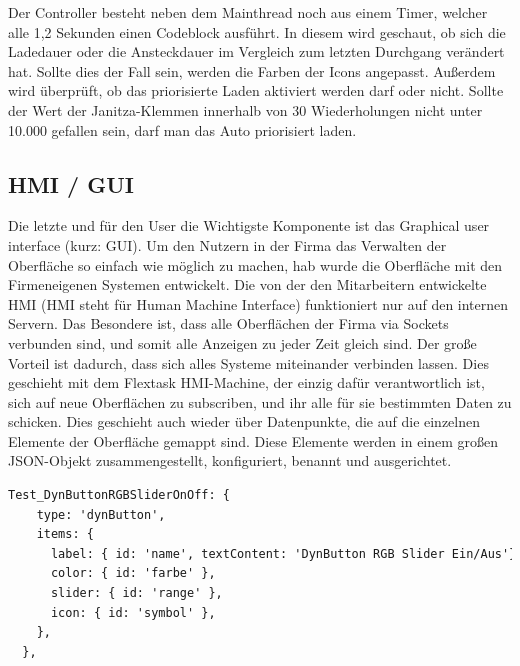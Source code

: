 Der Controller besteht neben dem Mainthread noch aus einem Timer, welcher alle 1,2 Sekunden einen Codeblock ausführt. In diesem wird geschaut, ob sich die Ladedauer oder die Ansteckdauer im Vergleich zum letzten Durchgang verändert hat. Sollte dies der Fall sein, werden die Farben der Icons angepasst. Außerdem wird überprüft, ob das priorisierte Laden aktiviert werden darf oder nicht. Sollte der Wert der Janitza-Klemmen innerhalb von 30 Wiederholungen nicht unter 10.000 gefallen sein, darf man das Auto priorisiert laden.

\subsection{HMI / GUI} 
Die letzte und für den User die Wichtigste Komponente ist das Graphical user interface (kurz: GUI). Um den Nutzern in der Firma das Verwalten der Oberfläche so einfach wie möglich zu machen, hab wurde die Oberfläche mit den Firmeneigenen Systemen entwickelt. Die von der den Mitarbeitern entwickelte HMI (HMI steht für Human Machine Interface) funktioniert nur auf den internen Servern. Das Besondere ist, dass alle Oberflächen der Firma via Sockets verbunden sind, und somit alle Anzeigen zu jeder Zeit gleich sind. Der große Vorteil ist dadurch, dass sich alles Systeme miteinander verbinden lassen. Dies geschieht mit dem Flextask 	\glqq HMI-Machine\grqq{}, der einzig dafür verantwortlich ist, sich auf neue Oberflächen zu subscriben, und ihr alle für sie bestimmten Daten zu schicken. Dies geschieht auch wieder über Datenpunkte, die auf die einzelnen Elemente der Oberfläche gemappt sind. Diese Elemente werden in einem großen JSON-Objekt zusammengestellt, konfiguriert, benannt und ausgerichtet. 

\begin{lstlisting}[language=HTML,caption=Example Element,label=lst:impl:foo]
  Test_DynButtonRGBSliderOnOff: { 
    type: 'dynButton', 
    items: { 
      label: { id: 'name', textContent: 'DynButton RGB Slider Ein/Aus'}, 
      color: { id: 'farbe' }, 
      slider: { id: 'range' }, 
      icon: { id: 'symbol' }, 
    }, 
  }, 
\end{lstlisting}


